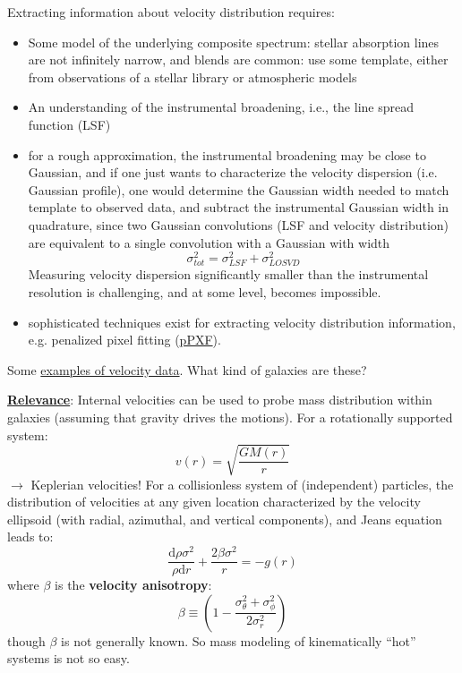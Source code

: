 \documentclass{article}
\newcommand{\mynotes}[1]{\textcolor{cadmiumgreen}{#1}}
\begin{document}
Extracting information about velocity distribution requires:
\begin{itemize}
    \item Some model of the underlying composite spectrum: stellar absorption
        lines are not infinitely narrow, and blends are common: use some
        template, either from observations of a stellar library or atmospheric
        models
    \item An understanding of the instrumental broadening, i.e., the line
        spread function (LSF)
    \item for a rough approximation, the instrumental broadening may be close
        to Gaussian, and if one just wants to characterize the velocity
        dispersion (i.e. Gaussian profile), one would determine the Gaussian
        width needed to match template to observed data, and subtract the
        instrumental Gaussian width in quadrature, since two Gaussian
        convolutions (LSF and velocity distribution) are equivalent to a single
        convolution with a Gaussian with width
        \[
            \sigma_{tot}^{2} = \sigma_{LSF}^{2} + \sigma_{LOSVD}^{2}
            \]
        Measuring velocity dispersion significantly smaller than the
        instrumental resolution is challenging, and at some level, becomes
        impossible.
    \item sophisticated techniques exist for extracting velocity distribution
        information, e.g. penalized pixel fitting
        (\href{}
        {pPXF}).
\end{itemize}

Some
\href{http://astronomy.nmsu.edu/holtz/a555/resources/examplesh3h4.gif}
{examples of velocity data}. What kind of galaxies are these?

\underline{\textbf{Relevance}}:
Internal velocities can be used to probe mass distribution within
galaxies (assuming that gravity drives the motions).
For a rotationally supported system:
\[
    v(r) = \sqrt{\frac{GM(r)}{r}}
    \]
\mynotes{$\rightarrow$ Keplerian velocities!}
For a collisionless system of \mynotes{(independent)} particles,
the distribution of velocities at
any given location characterized by the velocity ellipsoid
(with radial, azimuthal, and vertical components),
and Jeans equation leads to:
\[
    \frac{\mathrm{d}\rho\sigma^{2}}{\rho{\mathrm{d}r}} +
    \frac{2\beta\sigma^{2}}{r} = -g(r)
    \]
where $\beta$ is the \textbf{velocity anisotropy}:
\[
    \beta \equiv \left(
        1 - \frac{\sigma_{\theta}^{2}+\sigma_{\phi}^{2}}{2\sigma_{r}^{2}}
    \right)
    \]
though $\beta$ is not generally known. So mass modeling of kinematically
``hot'' systems is not so easy.
\end{document}
